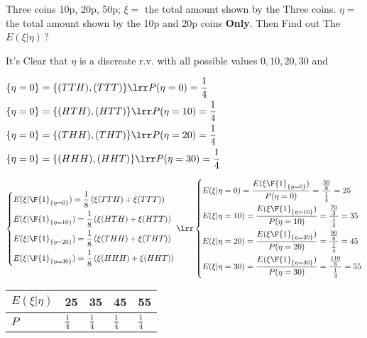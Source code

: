 
Three coins 10p, 20p, 50p; $\xi=$ the total amount shown by the Three coins.
$\eta=$ the total amount shown by the 10p and 20p coins \textbf{Only}. Then Find out 
The $E(\xi|\eta)$\,?


It's Clear that $\eta$ is a discreate r.v. with all possible values $0, 10, 20, 30$ and 

\vspace*{1em}
$
\begin{aligned}
    & \{\eta=0\} = \{(TTH), (TTT)\} \lrr P(\eta=0) = \frac14\\
    & \{\eta=0\} = \{(HTH), (HTT)\} \lrr P(\eta=10) = \frac14\\
    & \{\eta=0\} = \{(THH), (THT)\} \lrr P(\eta=20) = \frac14\\
    & \{\eta=0\} = \{(HHH), (HHT)\} \lrr P(\eta=30) = \frac14\\
\end{aligned}
$


\noindent$
\left\{
\begin{aligned}
    & E(\xi|\F{1}_{\{\eta=0\}}) = \frac{1}{8} \left(\xi(TTH)+\xi(TTT)\right)\\
    & E(\xi|\F{1}_{\{\eta=10\}}) = \frac{1}{8} \left(\xi(HTH)+\xi(HTT)\right)\\
    & E(\xi|\F{1}_{\{\eta=20\}}) = \frac{1}{8} \left(\xi(THH)+\xi(THT)\right)\\
    & E(\xi|\F{1}_{\{\eta=30\}}) = \frac{1}{8} \left(\xi(HHH)+\xi(HHT)\right)
\end{aligned}
\right.
\lrr
\left\{
\begin{aligned}
    & E(\xi|\eta=0) = \frac{E(\xi\F{1}_{\{\eta=0\}})}{P(\eta=0)} = \frac{\frac{50}{8}}{\frac{1}{4}} = 25\\
    & E(\xi|\eta=10) = \frac{E(\xi\F{1}_{\{\eta=10\}})}{P(\eta=10)} = \frac{\frac{70}{3}}{\frac{1}{4}} = 35\\
    & E(\xi|\eta=20) = \frac{E(\xi\F{1}_{\{\eta=20\}})}{P(\eta=20)} = \frac{\frac{90}{8}}{\frac{1}{4}} = 45\\
    & E(\xi|\eta=30) = \frac{E(\xi\F{1}_{\{\eta=30\}})}{P(\eta=30)} = \frac{\frac{110}{8}}{\frac{1}{4}} = 55
\end{aligned}
\right.
$

\begin{center}
    \begin{tabular}{p{6em}|p{6em}p{6em}p{6em}p{6em}}
        $E(\xi|\eta)$ & 25 & 35 & 45 & 55 \\
        \hline
        $P$ & $\frac14$ & $\frac14$ & $\frac14$ & $\frac14$\\  
    \end{tabular} 
\end{center}

